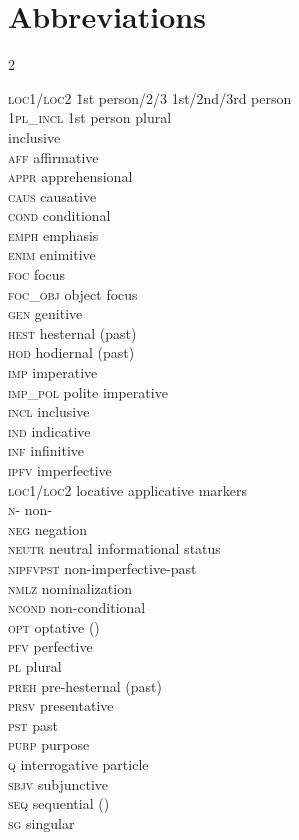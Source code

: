 \documentclass[output=paper,colorlinks,citecolor=brown]{langscibook}
\begin{document}
\section*{Abbreviations}
\begin{multicols}{2}
\begin{tabbing}
\textsc{loc1/loc2} \= 1st person/2/3 \> 1st/2nd/3rd person \\
1\textsc{pl\_incl} \> 1st person plural \\
{} \> inclusive \\
\textsc{aff} \> affirmative \\
\textsc{appr} \> apprehensional \\
\textsc{caus} \> causative \\
\textsc{cond} \> conditional \\
\textsc{emph} \> emphasis \\
\textsc{enim} \> enimitive \\
\textsc{foc} \> focus \\
\textsc{foc\_obj} \> object focus \\
\textsc{gen} \> genitive \\
\textsc{hest} \> hesternal (past) \\
\textsc{hod} \> hodiernal (past) \\
\textsc{imp} \> imperative \\
\textsc{imp\_pol} \> polite imperative \\
\textsc{incl} \> inclusive\\
\textsc{ind} \> indicative \\
\textsc{inf} \> infinitive \\
\textsc{ipfv} \> imperfective \\
\textsc{loc1/loc2} \> locative applicative markers \\
\textsc{n-} \> non- \\
\textsc{neg} \> negation \\
\textsc{neutr} \> neutral informational status \\
\textsc{nipfvpst} \> non-imperfective-past \\
\textsc{nmlz} \> nominalization \\
\textsc{ncond} \> non-conditional \\
\textsc{opt} \> optative () \\
\textsc{pfv} \> perfective \\
\textsc{pl} \> plural \\
\textsc{preh} \> pre-hesternal (past) \\
\textsc{prsv} \> presentative \\
\textsc{pst} \> past \\
\textsc{purp} \> purpose \\
\textsc{q} \> interrogative particle \\
\textsc{sbjv} \> subjunctive \\
\textsc{seq} \> sequential () \\
\textsc{sg} \> singular 
\end{tabbing}
\end{multicols}
\end{document}
